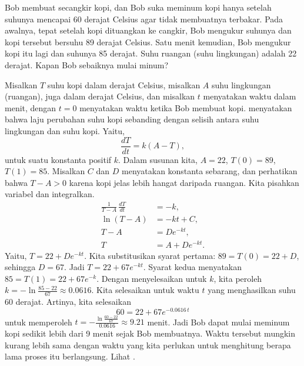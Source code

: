 \begin{example} \label{sep:coffeeexample}
Bob membuat secangkir kopi, dan
Bob suka meminum kopi hanya setelah suhunya mencapai 60 derajat Celsius agar tidak membuatnya terbakar.
Pada awalnya, tepat setelah kopi dituangkan ke cangkir,
Bob mengukur suhunya dan kopi tersebut bersuhu 89 derajat Celsius.
Satu menit kemudian, Bob mengukur kopi itu lagi dan suhunya 85 derajat.
Suhu ruangan (suhu lingkungan) adalah 22 derajat.
Kapan Bob sebaiknya mulai minum?

Misalkan $T$ suhu kopi dalam derajat Celsius, misalkan $A$
suhu lingkungan (ruangan), juga dalam derajat Celsius,
dan misalkan $t$ menyatakan waktu dalam menit, dengan $t=0$ menyatakan waktu
ketika Bob membuat kopi.
 menyatakan bahwa laju perubahan
suhu kopi
sebanding dengan selisih antara
suhu lingkungan dan suhu kopi.  Yaitu,
\begin{equation*}
\frac{dT}{dt} = k(A-T) ,
\end{equation*}
untuk suatu konstanta positif $k$.
Dalam susunan kita, $A=22$, $T(0) = 89$, $T(1) = 85$.
Misalkan $C$ dan $D$ menyatakan konstanta
sebarang, dan perhatikan bahwa $T - A > 0$ karena kopi jelas lebih hangat
daripada ruangan.
Kita pisahkan variabel dan integralkan.
\begin{align*}
\frac{1}{T-A} \, \frac{dT}{dt} & = -k , \\
\ln (T-A) &= -kt + C , \\ %
T-A &= D e^{-kt} ,  \\
T &= A + D e^{-kt} .
\end{align*}
Yaitu,
$T = 22 + D e^{-kt}$.  Kita substitusikan syarat pertama: $89 = T(0) = 22 +
D$,
sehingga $D = 67$.  Jadi
$T = 22 + 67 e^{-kt}$.  Syarat kedua menyatakan $85 = T(1) =
22 + 67 e^{-k}$.  Dengan menyelesaikan untuk $k$, kita peroleh
$k = - \ln \frac{85-22}{67} \approx 0.0616$.  Kita selesaikan untuk waktu $t$
yang menghasilkan suhu 60 derajat.  Artinya, kita selesaikan
\begin{equation*}
60 = 22 + 67 e^{-0.0616\,t}
\end{equation*}
untuk memperoleh
$t = - \frac{\ln \frac{60-22}{67}}{0.0616} \approx 9.21$ menit.  Jadi Bob dapat
mulai meminum kopi sedikit lebih dari 9 menit sejak Bob
membuatnya.  Waktu tersebut mungkin kurang lebih sama dengan waktu yang kita perlukan untuk menghitung
berapa lama proses itu berlangsung.  Lihat .
\begin{myfig}

\end{myfig}
\end{example}
